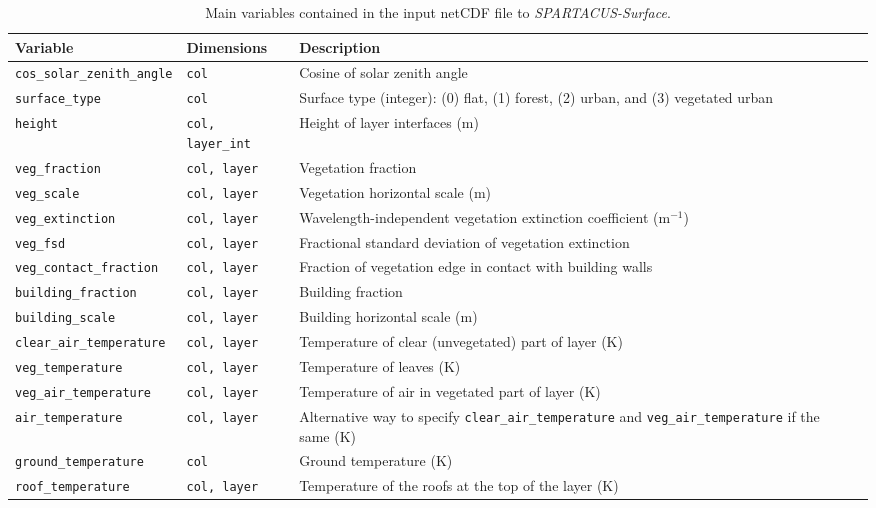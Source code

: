 \documentclass[a4,oneside]{article}
\def\tablesetup{\rowcolors{2}{light-gray}{light-gray}\footnotesize}
\def\codetabsize{\footnotesize}
\def\spsurf{\emph{SPARTACUS-Surface}}
\def\codetab#1{{\codetabsize\texttt{#1}}}
\begin{document}
\begin{center}
\tablesetup
\begin{longtable}{llLp{8cm}}%
\caption{\label{tab:invar}Main variables contained in the input netCDF
  file to \spsurf.}\\
%
\hline
Variable & Dimensions & Description \\
\hline
\codetab{cos\_solar\_zenith\_angle} & \codetab{col} & Cosine of solar zenith angle \\
\codetab{surface\_type} & \codetab{col} & Surface type (integer): (0) flat, (1) forest, (2) urban, and (3) vegetated urban \\
\codetab{height} & \codetab{col, layer\_int} & Height of layer interfaces (m) \\
\codetab{veg\_fraction} & \codetab{col, layer} & Vegetation fraction \\
\codetab{veg\_scale} & \codetab{col, layer} & Vegetation horizontal scale (m) \\
\codetab{veg\_extinction} & \codetab{col, layer} & Wavelength-independent vegetation extinction coefficient (m$^{-1}$) \\
\codetab{veg\_fsd} & \codetab{col, layer} & Fractional standard deviation of vegetation extinction \\
\codetab{veg\_contact\_fraction} & \codetab{col, layer} & Fraction of vegetation edge in contact with building walls \\
%
\codetab{building\_fraction} & \codetab{col, layer} & Building fraction \\
\codetab{building\_scale} & \codetab{col, layer} & Building horizontal scale (m) \\
%
\codetab{clear\_air\_temperature} & \codetab{col, layer} & Temperature of clear (unvegetated) part of layer (K) \\
\codetab{veg\_temperature} & \codetab{col, layer} & Temperature of leaves (K) \\
\codetab{veg\_air\_temperature} & \codetab{col, layer} & Temperature of air in vegetated part of layer (K) \\
\codetab{air\_temperature} & \codetab{col, layer} & Alternative way to specify \codetab{clear\_air\_temperature} and \codetab{veg\_air\_temperature} if the same (K) \\
\codetab{ground\_temperature} & \codetab{col} & Ground temperature (K) \\
\codetab{roof\_temperature} & \codetab{col, layer} & Temperature of the roofs at the top of the layer (K) \\

\end{longtable}
\end{center}
\end{document}
